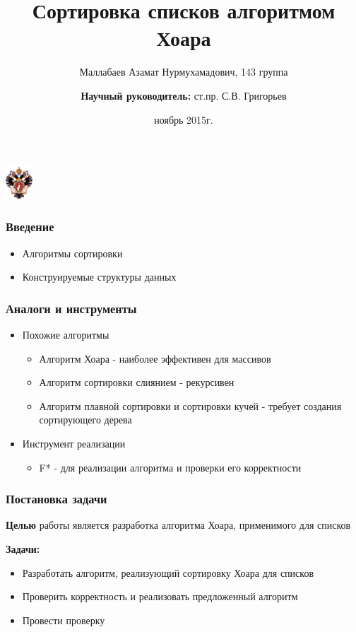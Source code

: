 \documentclass{beamer}
\title[]{Сортировка списков алгоритмом Хоара}
\institute[СПбГУ]{
Санкт-Петербургский государственный университет \\
Кафедра системного программирования }
\author[Маллабаев Азамат]{Маллабаев Азамат Нурмухамадович, 143 группа \\
  \and  
    {\bfseries Научный руководитель:} ст.пр. С.В. Григорьев \\ 
  }
\date{ноябрь 2015г.}
\begin{document}
{
\begin{frame}
  \begin{center}
  {\includegraphics[width=1cm]{pictures/SPbGU_Logo.png}}
  \end{center}
  \titlepage
\end{frame}
}

\begin{frame}[fragile]
  \transwipe[direction=90]
  \frametitle{Введение}
  \begin{itemize}
    \item Алгоритмы сортировки
    \item Конструируемые структуры данных
  \end{itemize}
\end{frame}
            
\begin{frame}
  \transwipe[direction=90]
  \frametitle{Аналоги и инструменты}
  \begin{itemize}
    \item Похожие алгоритмы
    \begin{itemize}
      \item Алгоритм Хоара - наиболее эффективен для массивов
      \item Алгоритм сортировки слиянием - рекурсивен
      \item Алгоритм плавной сортировки и сортировки кучей - требует создания сортирующего дерева
    \end{itemize}
    \item Инструмент реализации          
    \begin{itemize}                                              
      \item F* - для реализации алгоритма и проверки его корректности         
    \end{itemize}
  \end{itemize}
\end{frame}

\begin{frame}
  \transwipe[direction=90]
  \frametitle{Постановка задачи}
  \textbf{Целью} работы является разработка алгоритма Хоара, применимого для списков

  \textbf{Задачи:}
  \begin{itemize}
    \item Разработать алгоритм, реализующий сортировку Хоара для списков
    \item Проверить корректность и реализовать предложенный алгоритм
    \item Провести проверку
  \end{itemize}
\end{frame}
\end{document}
